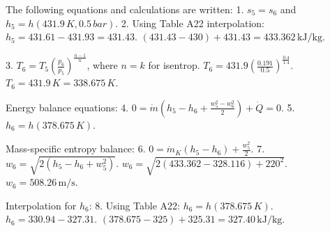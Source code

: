 The following equations and calculations are written:  
1. \( s_5 = s_6 \) and \( h_5 = h(431.9 \, K, 0.5 \, bar) \).  
2. Using Table A22 interpolation:  
   \( h_5 = 431.61 - 431.93 = 431.43 \).  
   \( (431.43 - 430) + 431.43 = 433.362 \, \text{kJ/kg} \).  

3. \( T_6 = T_5 \left( \frac{p_6}{p_5} \right)^{\frac{n-1}{n}} \), where \( n = k \) for isentrop.  
   \( T_6 = 431.9 \left( \frac{0.191}{0.5} \right)^{\frac{0.4}{1.4}} \).  
   \( T_6 = 431.9 \, K = 338.675 \, K \).  

Energy balance equations:  
4. \( 0 = \dot{m}(h_5 - h_6 + \frac{w_5^2 - w_6^2}{2}) + \dot{Q} = 0 \).  
5. \( h_6 = h(378.675 \, K) \).  

Mass-specific entropy balance:  
6. \( 0 = \dot{m}_K(h_5 - h_6) + \frac{w_5^2}{2} \).  
7. \( w_6 = \sqrt{2(h_5 - h_6 + w_5^2)} \).  
   \( w_6 = \sqrt{2(433.362 - 328.116) + 220^2} \).  
   \( w_6 = 508.26 \, \text{m/s} \).  

Interpolation for \( h_6 \):  
8. Using Table A22:  
   \( h_6 = h(378.675 \, K) \).  
   \( h_6 = 330.94 - 327.31 \).  
   \( (378.675 - 325) + 325.31 = 327.40 \, \text{kJ/kg} \).